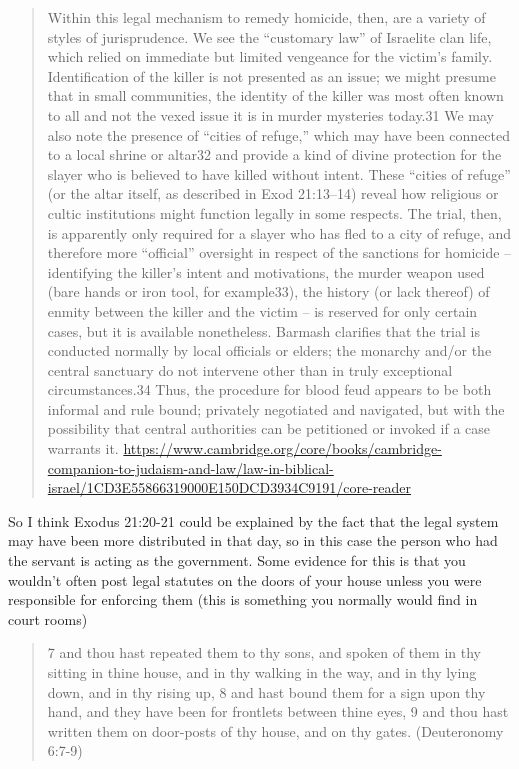 \documentclass[11pt]{article}
\begin{document}
{\begin{quote}
Within this legal mechanism to remedy homicide, then, are a variety of styles of jurisprudence. We see the “customary law” of Israelite clan life, which relied on immediate but limited vengeance for the victim’s family. Identification of the killer is not presented as an issue; we might presume that in small communities, the identity of the killer was most often known to all and not the vexed issue it is in murder mysteries today.31 We may also note the presence of “cities of refuge,” which may have been connected to a local shrine or altar32 and provide a kind of divine protection for the slayer who is believed to have killed without intent. These “cities of refuge” (or the altar itself, as described in Exod 21:13–14) reveal how religious or cultic institutions might function legally in some respects. The trial, then, is apparently only required for a slayer who has fled to a city of refuge, and therefore more “official” oversight in respect of the sanctions for homicide – identifying the killer’s intent and motivations, the murder weapon used (bare hands or iron tool, for example33), the history (or lack thereof) of enmity between the killer and the victim – is reserved for only certain cases, but it is available nonetheless. Barmash clarifies that the trial is conducted normally by local officials or elders; the monarchy and/or the central sanctuary do not intervene other than in truly exceptional circumstances.34 Thus, the procedure for blood feud appears to be both informal and rule bound; privately negotiated and navigated, but with the possibility that central authorities can be petitioned or invoked if a case warrants it.
\url{https://www.cambridge.org/core/books/cambridge-companion-to-judaism-and-law/law-in-biblical-israel/1CD3E55866319000E150DCD3934C9191/core-reader}
\end{quote}

So I think Exodus 21:20-21 could be explained by the fact that the legal system may have been more distributed in that day, so in this case the person who had the servant is acting as the government. Some evidence for this is that you wouldn't often post legal statutes on the doors of your house unless you were responsible for enforcing them (this is something you normally would find in court rooms)


\begin{quote}
7 and thou hast repeated them to thy sons, and spoken of them in thy sitting in thine house, and in thy walking in the way, and in thy lying down, and in thy rising up,
8 and hast bound them for a sign upon thy hand, and they have been for frontlets between thine eyes,
9 and thou hast written them on door-posts of thy house, and on thy gates. (Deuteronomy 6:7-9)
\end{quote} 

}
\end{document}
